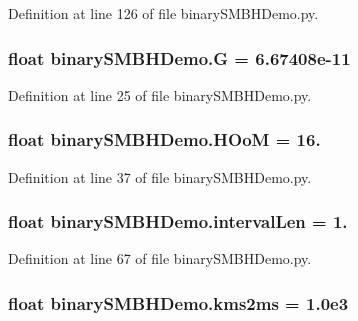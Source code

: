 Definition at line 126 of file binary\-S\-M\-B\-H\-Demo.\-py.

\hypertarget{namespacebinary_s_m_b_h_demo_a5dd1de9b7e9291ff2d603fb787279034}{
\subsubsection[{G}]{\setlength{\rightskip}{0pt plus 5cm}float binary\-S\-M\-B\-H\-Demo.\-G = 6.\-67408e-\/11}}\label{namespacebinary_s_m_b_h_demo_a5dd1de9b7e9291ff2d603fb787279034}


Definition at line 25 of file binary\-S\-M\-B\-H\-Demo.\-py.

\hypertarget{namespacebinary_s_m_b_h_demo_a6bca186959a52214cc4eebeb4ab162e6}{
\subsubsection[{H\-Oo\-M}]{\setlength{\rightskip}{0pt plus 5cm}float binary\-S\-M\-B\-H\-Demo.\-H\-Oo\-M = 16.}}\label{namespacebinary_s_m_b_h_demo_a6bca186959a52214cc4eebeb4ab162e6}


Definition at line 37 of file binary\-S\-M\-B\-H\-Demo.\-py.

\hypertarget{namespacebinary_s_m_b_h_demo_af275b72ef534a7d65cad36eb28c582f5}{
\subsubsection[{interval\-Len}]{\setlength{\rightskip}{0pt plus 5cm}float binary\-S\-M\-B\-H\-Demo.\-interval\-Len = 1.}}\label{namespacebinary_s_m_b_h_demo_af275b72ef534a7d65cad36eb28c582f5}


Definition at line 67 of file binary\-S\-M\-B\-H\-Demo.\-py.

\hypertarget{namespacebinary_s_m_b_h_demo_a45b4858d5e1b210896d6e647bfa40f1f}{
\subsubsection[{kms2ms}]{\setlength{\rightskip}{0pt plus 5cm}float binary\-S\-M\-B\-H\-Demo.\-kms2ms = 1.\-0e3}}\label{namespacebinary_s_m_b_h_demo_a45b4858d5e1b210896d6e647bfa40f1f}


